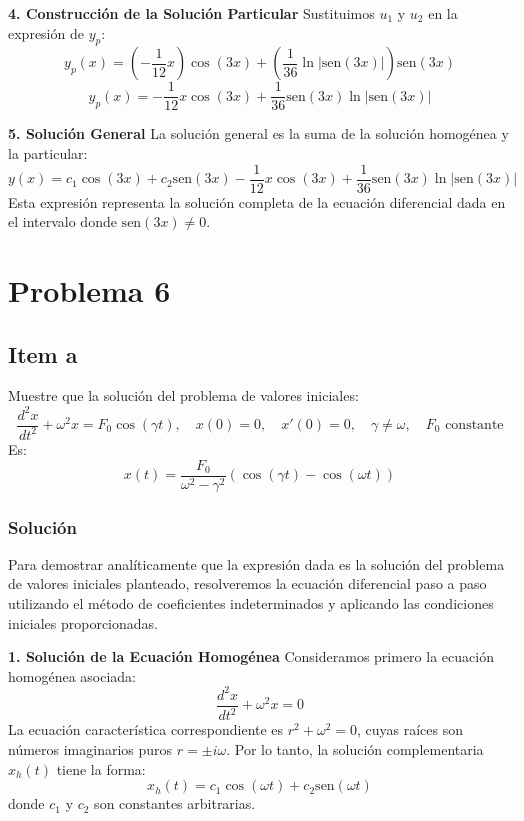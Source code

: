 \documentclass[a4paper]{article}
\begin{document}
\textbf{4. Construcción de la Solución Particular}
Sustituimos $u_1$ y $u_2$ en la expresión de $y_p$:
$$
y_p(x) = \left( -\frac{1}{12} x \right) \cos(3x) + \left( \frac{1}{36} \ln|\text{sen}(3x)| \right) \text{sen}(3x)
$$
$$
y_p(x) = -\frac{1}{12} x \cos(3x) + \frac{1}{36} \text{sen}(3x) \ln|\text{sen}(3x)|
$$

\textbf{5. Solución General}
La solución general es la suma de la solución homogénea y la particular:
$$
y(x) = c_1 \cos(3x) + c_2 \text{sen}(3x) - \frac{1}{12} x \cos(3x) + \frac{1}{36} \text{sen}(3x) \ln|\text{sen}(3x)|
$$
Esta expresión representa la solución completa de la ecuación diferencial dada en el intervalo donde $\text{sen}(3x) \neq 0$.


\section{Problema 6}
\subsection{Item a}
Muestre que la solución del problema de valores iniciales:
$$
\frac{d^2x}{dt^2} + \omega^2 x = F_0 \cos(\gamma t), \quad x(0)= 0, \quad x'(0)= 0, \quad \gamma \neq \omega, \quad F_0 \text{ constante}
$$
Es:
$$
x(t) = \frac{F_0}{\omega^2 - \gamma^2} (\cos(\gamma t) - \cos(\omega t))
$$

\subsubsection{Solución}
Para demostrar analíticamente que la expresión dada es la solución del problema de valores iniciales planteado, resolveremos la ecuación diferencial paso a paso utilizando el método de coeficientes indeterminados y aplicando las condiciones iniciales proporcionadas.

\textbf{1. Solución de la Ecuación Homogénea}
Consideramos primero la ecuación homogénea asociada:
$$
\frac{d^2x}{dt^2} + \omega^2 x = 0
$$
La ecuación característica correspondiente es $r^2 + \omega^2 = 0$, cuyas raíces son números imaginarios puros $r = \pm i\omega$. Por lo tanto, la solución complementaria $x_h(t)$ tiene la forma:
$$
x_h(t) = c_1 \cos(\omega t) + c_2 \text{sen}(\omega t)
$$
donde $c_1$ y $c_2$ son constantes arbitrarias.
\end{document}
